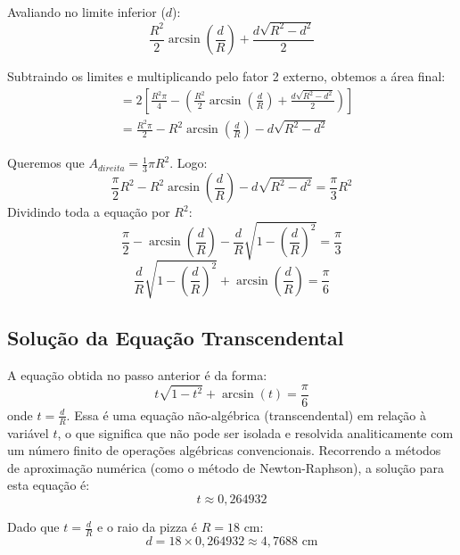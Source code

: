\documentclass[12pt,a4paper]{article}
\begin{document}
Avaliando no limite inferior ($d$):
\[ \frac{R^2}{2} \arcsin\left(\frac{d}{R}\right) + \frac{d \sqrt{R^2 - d^2}}{2} \]

Subtraindo os limites e multiplicando pelo fator 2 externo, obtemos a área final:
\begin{align*}
&= 2 \left[ \frac{R^2 \pi}{4} - \left( \frac{R^2}{2} \arcsin\left(\frac{d}{R}\right) + \frac{d \sqrt{R^2 - d^2}}{2} \right) \right] \\
&= \frac{R^2 \pi}{2} - R^2 \arcsin\left(\frac{d}{R}\right) - d \sqrt{R^2 - d^2}
\end{align*}


Queremos que $A_{direita} = \frac{1}{3} \pi R^2$. Logo:
\begin{equation}
\frac{\pi}{2} R^2 - R^2 \arcsin\left(\frac{d}{R}\right) - d \sqrt{R^2 - d^2} = \frac{\pi}{3} R^2
\end{equation}
Dividindo toda a equa\c{c}\~ao por $R^2$:
\begin{equation}
\frac{\pi}{2} - \arcsin\left(\frac{d}{R}\right) - \frac{d}{R} \sqrt{1 - \left(\frac{d}{R}\right)^2} = \frac{\pi}{3}
\end{equation}
\begin{equation}
\frac{d}{R} \sqrt{1 - \left(\frac{d}{R}\right)^2} + \arcsin\left(\frac{d}{R}\right) = \frac{\pi}{6}
\end{equation}

\subsection{Solu\c{c}\~ao da Equa\c{c}\~ao Transcendental}
A equa\c{c}\~ao obtida no passo anterior \'e da forma:
\begin{equation}
t \sqrt{1 - t^2} + \arcsin(t) = \frac{\pi}{6}
\end{equation}
onde $t = \frac{d}{R}$. Essa \'e uma equa\c{c}\~ao n\~ao-alg\'ebrica (transcendental) em rela\c{c}\~ao \`a vari\'avel $t$, o que significa que n\~ao pode ser isolada e resolvida analiticamente com um n\'umero finito de opera\c{c}\~oes alg\'ebricas convencionais. Recorrendo a m\'etodos de aproxima\c{c}\~ao num\'erica (como o m\'etodo de Newton-Raphson), a solu\c{c}\~ao para esta equa\c{c}\~ao \'e:
\[ t \approx 0,264932 \]

Dado que $t = \frac{d}{R}$ e o raio da pizza \'e $R = 18\text{ cm}$:
\[ d = 18 \times 0,264932 \approx 4,7688\text{ cm} \]
\end{document}
